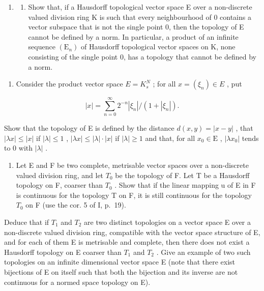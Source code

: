 \exercisegroup

\begin{enumerate}
\def\labelenumi{\arabic{enumi})}
\tightlist
\item
  \begin{enumerate}
  \def\labelenumii{\alph{enumii})}
  \tightlist
  \item
    Show that, if a Hausdorff topological vector space E over a non-discrete valued division ring K is such that every neighbourhood of 0 contains a vector subspace that is not the single point 0, then the topology of E cannot be defined by a norm. In particular, a product of an infinite sequence \((\mathrm{E}_{n})\) of Hausdorff topological vector spaces on K, none consisting of the single point 0, has a topology that cannot be defined by a norm.
  \end{enumerate}
\end{enumerate}

\begin{enumerate}
\def\labelenumi{\alph{enumi})}
\setcounter{enumi}{1}
\tightlist
\item
  Consider the product vector space \(E = K_{s}^{N}\) ; for all \(x = (\xi_{n}) \in E\) , put
\end{enumerate}

\[
| x | = \sum_ {n = 0} ^ {\infty} 2 ^ {- n} \left| \xi_ {n} \right| / (1 + | \xi_ {n} |).
\]

Show that the topology of E is defined by the distance \(d(x, y) = |x - y|\) , that \(|\lambda x| \leqslant |x|\) if \(|\lambda| \leqslant 1\) , \(|\lambda x| \leqslant |\lambda| \cdot |x|\) if \(|\lambda| \geqslant 1\) and that, for all \(x_0 \in \mathrm{E}\) , \(|\lambda x_0|\) tends to 0 with \(|\lambda|\) .

\begin{enumerate}
\def\labelenumi{\arabic{enumi})}
\setcounter{enumi}{1}
\tightlist
\item
  Let E and F be two complete, metrisable vector spaces over a non-discrete valued division ring, and let \(T_{0}\) be the topology of F. Let T be a Hausdorff topology on F, coarser than \(T_{0}\) . Show that if the linear mapping u of E in F is continuous for the topology T on F, it is still continuous for the topology \(T_{0}\) on F (use the cor. 5 of I, p.~19).
\end{enumerate}

Deduce that if \(T_{1}\) and \(T_{2}\) are two distinct topologies on a vector space E over a non-discrete valued division ring, compatible with the vector space structure of E, and for each of them E is metrisable and complete, then there does not exist a Hausdorff topology on E coarser than \(T_{1}\) and \(T_{2}\) . Give an example of two such topologies on an infinite dimensional vector space E (note that there exist bijections of E on itself such that both the bijection and its inverse are not continuous for a normed space topology on E).

